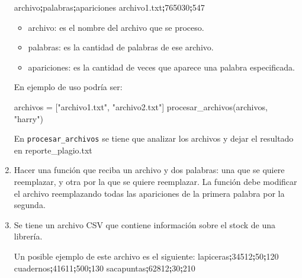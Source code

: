 \documentclass[
  letterpaper,
  DIV=11,
  numbers=noendperiod]{scrreprt}
\newenvironment{Shaded}{\begin{snugshade}}{\end{snugshade}}
\newcommand{\ExtensionTok}[1]{\textcolor[rgb]{0.00,0.23,0.31}{#1}}
\newcommand{\KeywordTok}[1]{\textcolor[rgb]{0.00,0.23,0.31}{\textbf{#1}}}
\newcommand{\NormalTok}[1]{\textcolor[rgb]{0.00,0.23,0.31}{#1}}
\newcommand{\OperatorTok}[1]{\textcolor[rgb]{0.37,0.37,0.37}{#1}}
\newcommand{\StringTok}[1]{\textcolor[rgb]{0.13,0.47,0.30}{#1}}
\providecommand{\tightlist}{%
  \setlength{\itemsep}{0pt}\setlength{\parskip}{0pt}}\usepackage{longtable,booktabs,array}
\begin{document}
\begin{enumerate}
\begin{Shaded}
\begin{Highlighting}[]
\ExtensionTok{archivo}\KeywordTok{;}\ExtensionTok{palabras}\KeywordTok{;}\ExtensionTok{apariciones}
\ExtensionTok{archivo1.txt}\KeywordTok{;}\ExtensionTok{765030}\KeywordTok{;}\ExtensionTok{547}
\end{Highlighting}
\end{Shaded}

  \begin{itemize}
  \tightlist
  \item
    archivo: es el nombre del archivo que se proceso.
  \item
    palabras: es la cantidad de palabras de ese archivo.
  \item
    apariciones: es la cantidad de veces que aparece una palabra
    especificada.
  \end{itemize}

  En ejemplo de uso podría ser:

\begin{Shaded}
\begin{Highlighting}[]
\NormalTok{archivos }\OperatorTok{=}\NormalTok{ [}\StringTok{"archivo1.txt"}\NormalTok{, }\StringTok{"archivo2.txt"}\NormalTok{]}
\NormalTok{procesar\_archivos(archivos, }\StringTok{"harry"}\NormalTok{)}
\end{Highlighting}
\end{Shaded}

  En \texttt{procesar\_archivos} se tiene que analizar los archivos y
  dejar el resultado en reporte\_plagio.txt
\item
  Hacer una función que reciba un archivo y dos palabras: una que se
  quiere reemplazar, y otra por la que se quiere reemplazar. La función
  debe modificar el archivo reemplazando todas las apariciones de la
  primera palabra por la segunda.
\item
  Se tiene un archivo CSV que contiene información sobre el stock de una
  librería.

\begin{Shaded}
\begin{Highlighting}[]
\ExtensionTok{Un}\NormalTok{ posible ejemplo de este archivo es el siguiente: }
    \ExtensionTok{lapiceras}\KeywordTok{;}\ExtensionTok{34512}\KeywordTok{;}\ExtensionTok{50}\KeywordTok{;}\ExtensionTok{120}
    \ExtensionTok{cuadernos}\KeywordTok{;}\ExtensionTok{41611}\KeywordTok{;}\ExtensionTok{500}\KeywordTok{;}\ExtensionTok{130}
    \ExtensionTok{sacapuntas}\KeywordTok{;}\ExtensionTok{62812}\KeywordTok{;}\ExtensionTok{30}\KeywordTok{;}\ExtensionTok{210}
\end{Highlighting}
\end{Shaded}


\end{enumerate}
\end{document}
